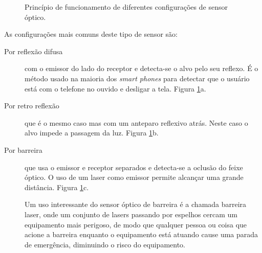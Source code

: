 \begin{figure}
  \centering
  \qquad

  \caption{Princípio de funcionamento de diferentes configurações de sensor óptico.}\label{fig:sensorOptico}
\end{figure}

As configurações mais comuns deste tipo de sensor são:
\begin{description}
  \item[Por reflexão difusa] com o emissor do lado do receptor e detecta-se o alvo pelo seu reflexo. É o método usado na maioria dos \emph{smart phones} para detectar que o usuário está com o telefone no ouvido e desligar a tela. Figura \ref{fig:sensorOptico}a.
  \item[Por retro reflexão] que é o mesmo caso mas com um anteparo reflexivo atrás. Neste caso o alvo impede a passagem da luz. Figura \ref{fig:sensorOptico}b.
  \item[Por barreira] que usa o emissor e receptor separados e detecta-se a oclusão do feixe óptico. O uso de um laser como emissor permite alcançar uma grande distância. Figura \ref{fig:sensorOptico}c.

  Um uso interessante do sensor óptico de barreira é a chamada barreira laser, onde um conjunto de lasers passando por espelhos cercam um equipamento mais perigoso, de modo que qualquer pessoa ou coisa que acione a barreira enquanto o equipamento está atuando cause uma parada de emergência, diminuindo o risco do equipamento.
\end{description}

